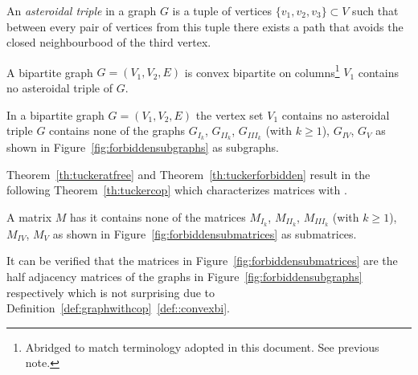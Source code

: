 \begin{definition}
  \label{def:asteroidal}
  An {\em asteroidal triple} in a graph $G$ is a tuple of vertices
  $\{v_1,v_2,v_3\} \subset V$ such that between every pair of vertices
  from this tuple there exists a path that avoids the closed
  neighbourbood of the third vertex.
\end{definition}

\begin{theoremsansproof}
  A bipartite graph $G = (V_1, V_2, E)$ is convex bipartite on
  columns\footnote{Abridged to match terminology adopted in this
    document. See previous note.} \iff $V_1$ contains no asteroidal
  triple of $G$.
  \label{th:tuckeratfree}
\end{theoremsansproof}

\begin{theoremsansproof}
  In a bipartite graph $G = (V_1, V_2, E)$ the vertex set $V_1$
  contains no asteroidal triple \iff $G$ contains none of the graphs
  $G_{I_k}$, $G_{II_k}$, $G_{III_k}$ (with $k \ge 1$), $G_{IV}$,
  $G_{V}$ as shown in Figure~\ref{fig:forbiddensubgraphs} as subgraphs.
  \label{th:tuckerforbidden}
\end{theoremsansproof}


\figforbiddensubgraphs


Theorem~\ref{th:tuckeratfree} and Theorem~\ref{th:tuckerforbidden}
result in the following Theorem~\ref{th:tuckercop} which characterizes
matrices with \COP.

\begin{theoremsansproof}
  A matrix $M$ has \COP \iff it contains none of the matrices 
$M_{I_k}$, $M_{II_k}$, $M_{III_k}$ (with $k \ge 1$), $M_{IV}$,
  $M_{V}$ as shown in Figure~\ref{fig:forbiddensubmatrices} as submatrices.
  \label{th:tuckercop}
\end{theoremsansproof}

\figforbiddensubmatrices

It can be verified that the matrices in
Figure~\ref{fig:forbiddensubmatrices} are the half adjacency matrices
of the graphs in Figure~\ref{fig:forbiddensubgraphs} respectively
which is not surprising due to
Definition~\ref{def:graphwithcop}~\ref{def::convexbi}.

